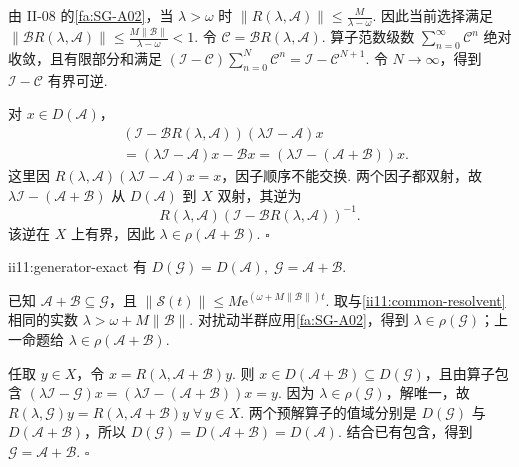 \begin{FAProof}
由 II-08 的\autoref{fa:SG-A02}，当 \(\displaystyle\lambda>\omega\) 时 \(\displaystyle \|R(\lambda,\mathcal A)\| \leqslant \frac{M}{\lambda-\omega}.\)
因此当前选择满足 \(\displaystyle \|\mathcal BR(\lambda,\mathcal A)\| \leqslant \frac{M\|\mathcal B\|}{\lambda-\omega} <1.\)
令 \(\displaystyle\mathcal C=\mathcal BR(\lambda,\mathcal A)\). 算子范数级数 \(\displaystyle\sum_{n=0}^{\infty}\mathcal C^n\) 绝对收敛，且有限部分和满足 \(\displaystyle(\mathcal I-\mathcal C)\sum_{n=0}^{N}\mathcal C^n=\mathcal I-\mathcal C^{N+1}\). 令 \(\displaystyle N\to\infty\)，得到 \(\displaystyle\mathcal I-\mathcal C\) 有界可逆.

对 \(\displaystyle x\in D(\mathcal A)\)，
\[
\begin{aligned}
&\left(
\mathcal I-\mathcal BR(\lambda,\mathcal A)
\right)
(\lambda\mathcal I-\mathcal A)x\\
&=
(\lambda\mathcal I-\mathcal A)x
-\mathcal Bx
=
\left(
\lambda\mathcal I-(\mathcal A+\mathcal B)
\right)x.
\end{aligned}
\]
这里因 \(\displaystyle R(\lambda,\mathcal A)(\lambda\mathcal I-\mathcal A)x=x\)，因子顺序不能交换. 两个因子都双射，故 \(\displaystyle\lambda\mathcal I-(\mathcal A+\mathcal B)\) 从 \(\displaystyle D(\mathcal A)\) 到 \(\displaystyle X\) 双射，其逆为
\[
R(\lambda,\mathcal A)
\left(
\mathcal I-\mathcal BR(\lambda,\mathcal A)
\right)^{-1}.
\]
该逆在 \(\displaystyle X\) 上有界，因此 \(\displaystyle\lambda\in\rho(\mathcal A+\mathcal B)\).
\hfill\(\square\)
\end{FAProof}

\begin{FAProposition}[B][扰动生成元的精确识别]{ii11:generator-exact}
有 \(\displaystyle D(\mathcal G)=D(\mathcal A), \; \mathcal G=\mathcal A+\mathcal B.\)
\end{FAProposition}

\begin{FAProof}
已知 \(\displaystyle\mathcal A+\mathcal B\subseteq\mathcal G\)，且 \(\displaystyle \|\mathcal S(t)\| \leqslant M\mathrm{e}^{(\omega+M\|\mathcal B\|)t}.\)
取与\autoref{ii11:common-resolvent}相同的实数 \(\displaystyle\lambda>\omega+M\|\mathcal B\|\). 对扰动半群应用\autoref{fa:SG-A02}，得到 \(\displaystyle\lambda\in\rho(\mathcal G)\)；上一命题给 \(\displaystyle\lambda\in\rho(\mathcal A+\mathcal B)\).

任取 \(\displaystyle y\in X\)，令 \(\displaystyle x=R(\lambda,\mathcal A+\mathcal B)y.\)
则 \(\displaystyle x\in D(\mathcal A+\mathcal B)\subseteq D(\mathcal G)\)，且由算子包含 \(\displaystyle (\lambda\mathcal I-\mathcal G)x = (\lambda\mathcal I-(\mathcal A+\mathcal B))x = y.\)
因为 \(\displaystyle\lambda\in\rho(\mathcal G)\)，解唯一，故 \(\displaystyle R(\lambda,\mathcal G)y = R(\lambda,\mathcal A+\mathcal B)y \; \forall\,y\in X.\)
两个预解算子的值域分别是 \(\displaystyle D(\mathcal G)\) 与 \(\displaystyle D(\mathcal A+\mathcal B)\)，所以 \(\displaystyle D(\mathcal G) = D(\mathcal A+\mathcal B) = D(\mathcal A).\)
结合已有包含，得到 \(\displaystyle\mathcal G=\mathcal A+\mathcal B\).
\hfill\(\square\)
\end{FAProof}

